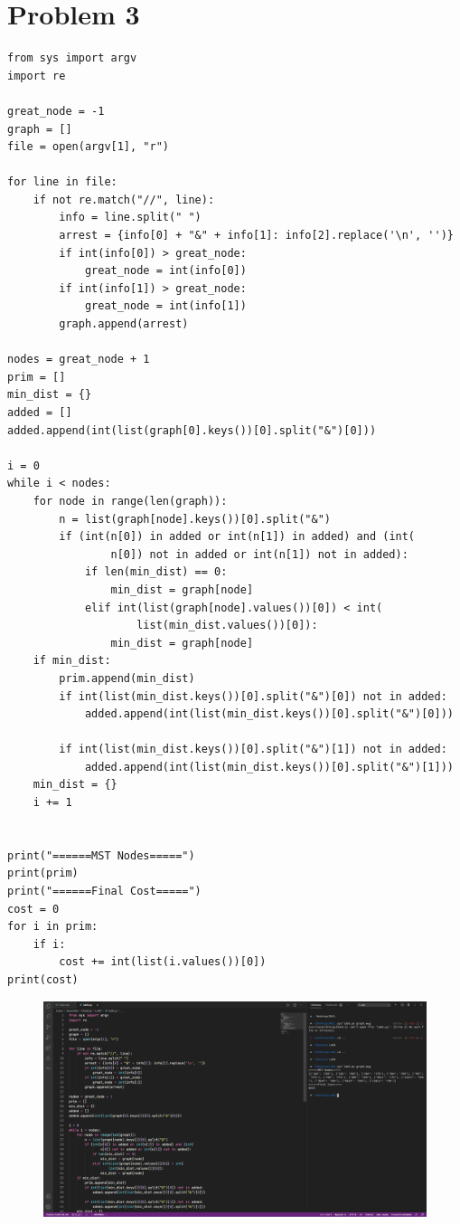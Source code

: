 \documentclass{article}
\begin{document}
\section{Problem 3}
\begin{lstlisting}
from sys import argv
import re

great_node = -1
graph = []
file = open(argv[1], "r")

for line in file:
    if not re.match("//", line):
        info = line.split(" ")
        arrest = {info[0] + "&" + info[1]: info[2].replace('\n', '')}
        if int(info[0]) > great_node:
            great_node = int(info[0])
        if int(info[1]) > great_node:
            great_node = int(info[1])
        graph.append(arrest)

nodes = great_node + 1
prim = []
min_dist = {}
added = []
added.append(int(list(graph[0].keys())[0].split("&")[0]))

i = 0
while i < nodes:
    for node in range(len(graph)):
        n = list(graph[node].keys())[0].split("&")
        if (int(n[0]) in added or int(n[1]) in added) and (int(
                n[0]) not in added or int(n[1]) not in added):
            if len(min_dist) == 0:
                min_dist = graph[node]
            elif int(list(graph[node].values())[0]) < int(
                    list(min_dist.values())[0]):
                min_dist = graph[node]
    if min_dist:
        prim.append(min_dist)
        if int(list(min_dist.keys())[0].split("&")[0]) not in added:
            added.append(int(list(min_dist.keys())[0].split("&")[0]))

        if int(list(min_dist.keys())[0].split("&")[1]) not in added:
            added.append(int(list(min_dist.keys())[0].split("&")[1]))
    min_dist = {}
    i += 1


print("======MST Nodes=====")
print(prim)
print("======Final Cost=====")
cost = 0
for i in prim:
    if i:
        cost += int(list(i.values())[0])
print(cost)
\end{lstlisting}


\begin{figure}[H]
    \centering
    \includegraphics[width=1\textwidth]{Fig3}
\end{figure}
\end{document}
